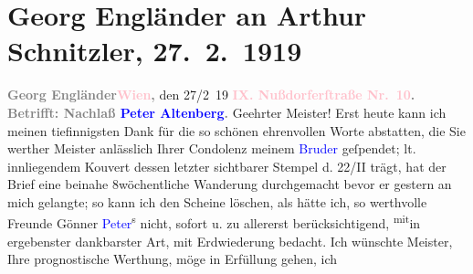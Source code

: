 

               \section[Georg Engländer an Arthur Schnitzler, 27. 2. 1919]{ Georg Engländer an Arthur Schnitzler, 27. 2. 1919}\nopagebreak{}\rehead{ }\normalsize\beginnumbering{} \toendnotes[C]{\smallbreak\pagebreak[2]} 
\toendnotes[C]{\smallbreak}\pstart
           \noindent{}{\pb}\textcolor{gray}{\textbf{Georg
                                Engländer}}\hfill \textcolor{gray}{\textbf{\textcolor{pink}{Wien}{}\ledrightnote{\textcolor{pink}{Wien}},}} den 27/2 19\pend
           \pstart
           \textcolor{gray}{\textbf{\textcolor{pink}{IX. Nußdorferſtraße
                                Nr. 10}{}\ledrightnote{\textcolor{pink}{Nussdorfer Straße}}.}}\pend
           \pstart
           \textcolor{gray}{\textbf{Betrifft: Nachlaß \textbf{\textcolor{blue}{Peter Altenberg}{}\ledrightnote{\textcolor{blue}{Peter Altenberg}}}.}}\pend
           \pstart{}Geehrter Meister!\pend\pstart
           Erst heute kann ich meinen tiefinnigsten Dank für die so schönen {\kaufmannsund} ehrenvollen Worte abstatten, die Sie werther
                    Meister anlässlich Ihrer Condolenz meinem \textcolor{blue}{Bruder}{} geſpendet; lt. innliegendem Kouvert dessen
                    letzter sichtbarer Stempel d. 22/II trägt, hat der Brief eine
                    beinahe 8wöchentliche Wanderung durchgemacht bevor er gestern an mich gelangte;
                    so kann ich den Scheine löschen, als hätte ich, so werthvolle Freunde {\kaufmannsund} Gönner \textcolor{blue}{Peter}{}\ledrightnote{\textcolor{blue}{Peter Altenberg}}\textsuperscript{s} nicht, sofort u. zu allererst
                    berücksichtigend, \substVorne{}\textsuperscript{mit}\substDazwischen{}in\substHinten{} ergebenster {\kaufmannsund} dankbarster Art, mit
                    Erdwiederung bedacht.\pend
           \pstart
           Ich wünschte Meister, Ihre prognostische Werthung, möge in Erfüllung gehen, ich

